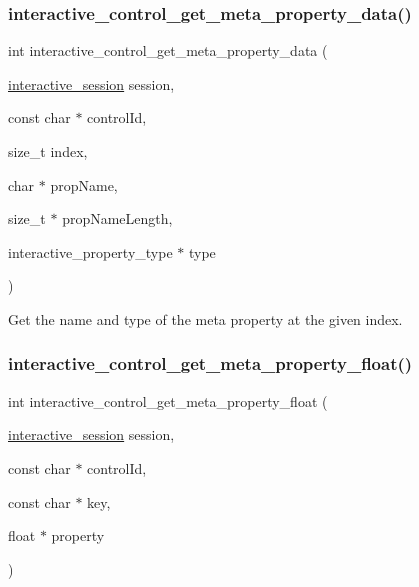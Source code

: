\subsubsection{\texorpdfstring{interactive\+\_\+control\+\_\+get\+\_\+meta\+\_\+property\+\_\+data()}{interactive\_control\_get\_meta\_property\_data()}}
{\footnotesize\ttfamily int interactive\+\_\+control\+\_\+get\+\_\+meta\+\_\+property\+\_\+data (\begin{DoxyParamCaption}\item[{\mbox{\hyperlink{group___interactivity_ga6d8819d38b8dc8994a2299cf22a65a31}{interactive\+\_\+session}}}]{session,  }\item[{const char $\ast$}]{control\+Id,  }\item[{size\+\_\+t}]{index,  }\item[{char $\ast$}]{prop\+Name,  }\item[{size\+\_\+t $\ast$}]{prop\+Name\+Length,  }\item[{interactive\+\_\+property\+\_\+type $\ast$}]{type }\end{DoxyParamCaption})}



Get the name and type of the meta property at the given index. 

\mbox{\label{group___interactivity_gac40a0df234fecd3723d058aef3e05bda}} 
\subsubsection{\texorpdfstring{interactive\+\_\+control\+\_\+get\+\_\+meta\+\_\+property\+\_\+float()}{interactive\_control\_get\_meta\_property\_float()}}
{\footnotesize\ttfamily int interactive\+\_\+control\+\_\+get\+\_\+meta\+\_\+property\+\_\+float (\begin{DoxyParamCaption}\item[{\mbox{\hyperlink{group___interactivity_ga6d8819d38b8dc8994a2299cf22a65a31}{interactive\+\_\+session}}}]{session,  }\item[{const char $\ast$}]{control\+Id,  }\item[{const char $\ast$}]{key,  }\item[{float $\ast$}]{property }\end{DoxyParamCaption})}



